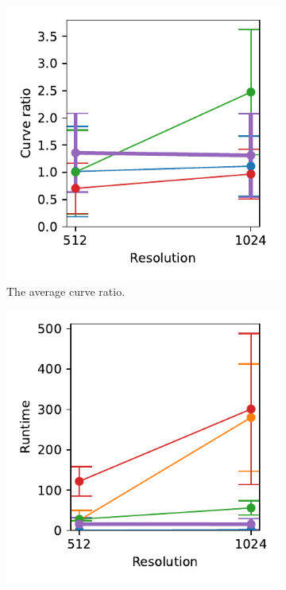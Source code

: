 \begin{figure}[!h]
\begin{subfigure}{.3\textwidth}
    \includegraphics[width=\textwidth]{graphics/eval/curve ratio_res_sketchbench.pdf}
    \caption{The average curve ratio.}
\end{subfigure}
    \begin{subfigure}{.3\textwidth}
    \centering
    \includegraphics[width=\textwidth]{graphics/eval/runtime_res_sketchbench.pdf}

\end{subfigure}
\end{figure}
